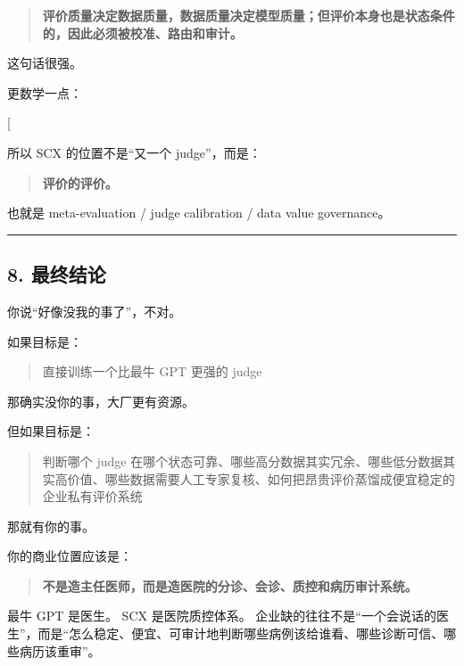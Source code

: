 \documentclass[
  12pt,
]{ctexart}
\begin{document}
\begin{quote}
\textbf{评价质量决定数据质量，数据质量决定模型质量；但评价本身也是状态条件的，因此必须被校准、路由和审计。}
\end{quote}

这句话很强。

更数学一点：

{[}  \leftarrow {} \leftarrow
{} \leftarrow
\text{State-conditioned judge reliability}{]}

所以 SCX 的位置不是``又一个 judge''，而是：

\begin{quote}
\textbf{评价的评价。}
\end{quote}

也就是 meta-evaluation / judge calibration / data value governance。

\begin{center}\rule{0.5\linewidth}{0.5pt}\end{center}

\subsection{8. 最终结论}\label{ux6700ux7ec8ux7ed3ux8bba-1}

你说``好像没我的事了''，不对。

如果目标是：

\begin{quote}
直接训练一个比最牛 GPT 更强的 judge
\end{quote}

那确实没你的事，大厂更有资源。

但如果目标是：

\begin{quote}
判断哪个 judge
在哪个状态可靠、哪些高分数据其实冗余、哪些低分数据其实高价值、哪些数据需要人工专家复核、如何把昂贵评价蒸馏成便宜稳定的企业私有评价系统
\end{quote}

那就有你的事。

你的商业位置应该是：

\begin{quote}
\textbf{不是造主任医师，而是造医院的分诊、会诊、质控和病历审计系统。}
\end{quote}

最牛 GPT 是医生。 SCX 是医院质控体系。
企业缺的往往不是``一个会说话的医生''，而是``怎么稳定、便宜、可审计地判断哪些病例该给谁看、哪些诊断可信、哪些病历该重审''。
\end{document}
